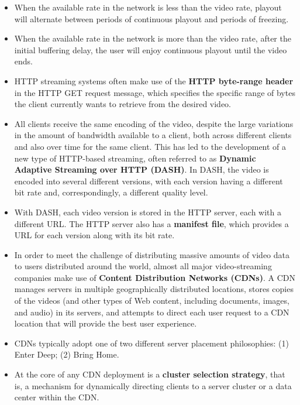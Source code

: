 \begin{itemize}
\item
When the available rate in the network is less than the video rate, playout will alternate between periods of continuous playout and periods of freezing.

\item
When the available rate in the network is more than the video rate, after the initial buffering delay, the user will enjoy continuous playout until the video ends.

\item
HTTP streaming systems often make use of the \textbf{HTTP byte-range header} in the HTTP GET request message, which specifies the specific range of bytes the client currently wants to retrieve from the desired video.

\item
All clients receive the same encoding of the video, despite the large variations in the amount of bandwidth available to a client, both across different clients and also over time for the same client. This has led to the development of a new type of HTTP-based streaming, often referred to as \textbf{Dynamic Adaptive Streaming over HTTP (DASH)}. In DASH, the video is encoded into several different versions, with each version having a different bit rate and, correspondingly, a different quality level.

\item
With DASH, each video version is stored in the HTTP server, each with a different URL. The HTTP server also has a \textbf{manifest file}, which provides a URL for each version along with its bit rate.

\item
In order to meet the challenge of distributing massive amounts of video data to users distributed around the world, almost all major video-streaming companies make use of \textbf{Content Distribution Networks (CDNs)}. A CDN manages servers in multiple geographically distributed locations, stores copies of the videos (and other types of Web content, including documents, images, and audio) in its servers, and attempts to direct each user request to a CDN location that will provide the best user experience.

\item
CDNs typically adopt one of two different server placement philosophies: (1) Enter Deep; (2) Bring Home.

\item
At the core of any CDN deployment is a \textbf{cluster selection strategy}, that is, a mechanism for dynamically directing clients to a server cluster or a data center within the CDN.


\end{itemize}
